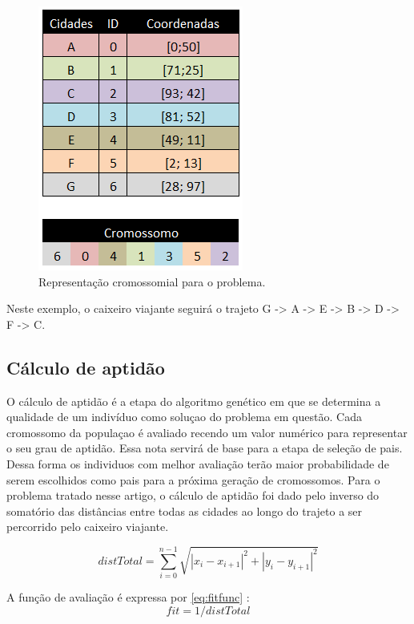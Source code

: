 \documentclass[twoside]{article}
\begin{document}
\begin{multicols}{2}
\begin{figure}[H]
  \caption{Representação cromossomial para o problema.}
  \centering
    \includegraphics[scale =  0.8]{crom_rep.png}
\end{figure}

Neste exemplo, o caixeiro viajante seguirá o trajeto G -> A -> E -> B -> D -> F -> C.

\subsection{Cálculo de aptidão}
O cálculo de aptidão é a etapa do algoritmo genético em que se determina a qualidade de um indivíduo como soluçao do problema em questão. Cada cromossomo da populaçao é avaliado recendo um valor numérico para representar o seu grau de aptidão. Essa nota servirá de base para a etapa de seleção de pais. Dessa forma os individuos com melhor avaliação terão maior probabilidade de serem escolhidos como pais para a próxima geração de cromossomos. Para o problema tratado nesse artigo, o cálculo de aptidão foi dado pelo inverso do somatório das distâncias entre todas as cidades ao longo do trajeto a ser percorrido pelo caixeiro viajante. 

\begin{equation}
\label{eq:distperc}
distTotal = \sum_{i=0}^{n-1} \sqrt{|x_{i} - x_{i+1}|^2 + |y_{i} - y_{i+1}|^2}
\end{equation}

A função de avaliação é expressa por \ref{eq:fitfunc} :
\begin{equation}
\label{eq:fitfunc}
fit = 1/distTotal
\end{equation}


\end{multicols}
\end{document}
